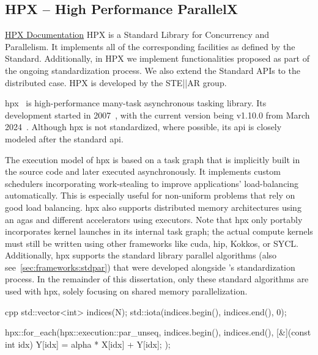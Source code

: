 \subsection{HPX -- High Performance ParallelX}
\label{sec:frameworks:hpx}

\begin{quotebox}{\href{https://hpx-docs.stellar-group.org/latest/html/index.html\#what-is-hpx}{HPX Documentation}}
    HPX is a \cpp Standard Library for Concurrency and Parallelism. It implements all of the corresponding facilities as defined by the \cpp Standard. Additionally, in HPX we implement functionalities proposed as part of the ongoing \cpp standardization process. We also extend the \cpp Standard APIs to the distributed case. HPX is developed by the STE||AR group.
\end{quotebox}

\acrfull{hpx}~\cite{kaiser_hpx_2020} is high-performance many-task asynchronous tasking library. 
Its development started in 2007~\cite{the_stear_group_history_nodate}, with the current version being v1.10.0 from March 2024~\cite{kaiser_stellar-grouphpx_2024}.
Although \gls{hpx} is not standardized, where possible, its \gls{api} is closely modeled after the \cpp standard \gls{api}. 

The execution model of \gls{hpx} is based on a task graph that is implicitly built in the source code and later executed asynchronously. 
It implements custom schedulers incorporating work-stealing to improve applications' load-balancing automatically. 
This is especially useful for non-uniform problems that rely on good load balancing. 
\gls{hpx} also supports distributed memory architectures using an \gls{agas} and different accelerators using executors. 
Note that \gls{hpx} only portably incorporates kernel launches in its internal task graph; the actual compute kernels must still be written using other frameworks like \gls{cuda}, \gls{hip}, Kokkos, or SYCL.  
Additionally, \gls{hpx} supports the  standard library parallel algorithms (also see~\autoref{sec:frameworks:stdpar}) that were developed alongside \cpp's standardization process. 
In the remainder of this dissertation, only these standard algorithms are used with \gls{hpx}, solely focusing on shared memory parallelization.  

\begin{listing}
    \begin{moderncode}{cpp}
std::vector<int> indices(N);
std::iota(indices.begin(), indices.end(), 0);

hpx::for_each(hpx::execution::par_unseq, indices.begin(), indices.end(), [&](const int idx) {
    Y[idx] = alpha * X[idx] + Y[idx];
});
    \end{moderncode}
    \caption{%
    A simple DAXPY example using \gls{hpx} parallel loops.}
    \label{code:hpx_example}
\end{listing}


